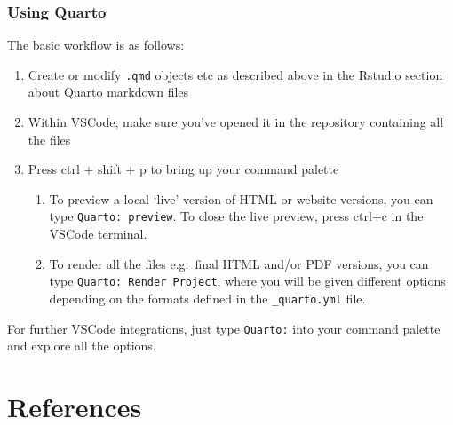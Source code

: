 \documentclass[
  letterpaper,
  DIV=11,
  numbers=noendperiod]{scrreprt}
\providecommand{\tightlist}{%
  \setlength{\itemsep}{0pt}\setlength{\parskip}{0pt}}\usepackage{longtable,booktabs,array}
\newlength{\cslhangindent}
\newlength{\cslentryspacingunit} %
\newenvironment{CSLReferences}[2] %
 {%
  \setlength{\parindent}{0pt}
  \ifodd #1
  \let\oldpar\par
  \def\par{\hangindent=\cslhangindent\oldpar}
  \fi
  \setlength{\parskip}{#2\cslentryspacingunit}
 }%
 {}
\begin{document}
\hypertarget{using-quarto}{%
\subsection{Using Quarto}\label{using-quarto}}

The basic workflow is as follows:

\begin{enumerate}
\def\labelenumi{\arabic{enumi}.}
\tightlist
\item
  Create or modify \texttt{.qmd} objects etc as described above in the
  Rstudio section about \protect\hyperlink{qmd-files}{Quarto markdown
  files}
\item
  Within VSCode, make sure you've opened it in the repository containing
  all the files
\item
  Press ctrl + shift + p to bring up your command palette

  \begin{enumerate}
  \def\labelenumii{\arabic{enumii}.}
  \tightlist
  \item
    To preview a local `live' version of HTML or website versions, you
    can type \texttt{Quarto:\ preview}. To close the live preview, press
    ctrl+c in the VSCode terminal.
  \item
    To render all the files e.g.~final HTML and/or PDF versions, you can
    type \texttt{Quarto:\ Render\ Project}, where you will be given
    different options depending on the formats defined in the
    \texttt{\_quarto.yml} file.
  \end{enumerate}
\end{enumerate}

For further VSCode integrations, just type \texttt{Quarto:} into your
command palette and explore all the options.


\hypertarget{references-1}{%
\chapter*{References}\label{references-1}}


\hypertarget{refs}{}
\begin{CSLReferences}{0}{0}
\end{CSLReferences}
\end{document}
